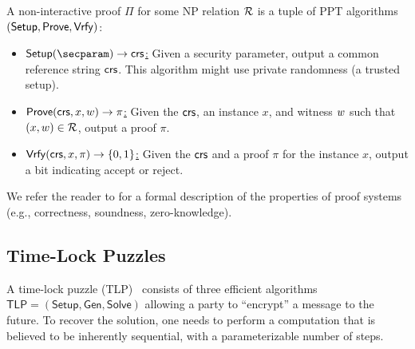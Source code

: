 \begin{definition} A non-interactive proof $\Pi$ for some NP relation $\mathcal{R}$ is a tuple of PPT algorithms $(\mathsf{Setup}, \mathsf{Prove}, \mathsf{Vrfy})$:
    \begin{itemize}
        \item \underline{$\setup(\secparam) \rightarrow \crs$:} Given a security parameter, output a common reference string $\mathsf{crs}$. This algorithm might use private randomness (a trusted setup).
        \item \underline{$\mathsf{Prove}(\mathsf{crs}, x, w) \rightarrow \pi$:} Given the $\mathsf{crs}$, an instance $x$, and witness $w$ such that $(x, w) \in \mathcal{R}$, output a proof $\pi$.
        \item \underline{$\mathsf{Vrfy}(\mathsf{crs}, x,\pi) \rightarrow \{0,1\}$:} Given the $\mathsf{crs}$ and a proof $\pi$ for the instance $x$, output a bit indicating accept or reject.
    \end{itemize}
\end{definition}

We refer the reader to \cite{Thaler23} for a formal description of the properties of proof systems (e.g., correctness, soundness, zero-knowledge). 



\subsection{Time-Lock Puzzles}\label{sec:tlp}

A time-lock puzzle (TLP)~\cite{RivShaWag96} consists of three efficient algorithms $\mathsf{TLP} = (\mathsf{Setup}, \mathsf{Gen}, \mathsf{Solve})$ allowing a party to ``encrypt'' a message to the future. To recover the solution, one needs to perform a computation that is believed to be inherently sequential, with a parameterizable number of steps.

